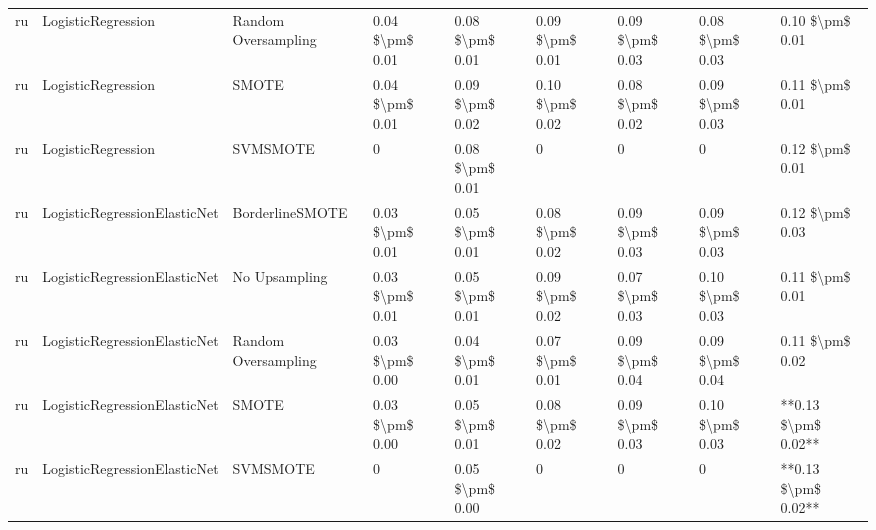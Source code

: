 \begin{tabular}{lllllllll}
      ru &              LogisticRegression &           Random Oversampling & 0.04 \$\textbackslash pm\$ 0.01 &           0.08 \$\textbackslash pm\$ 0.01 &       0.09 \$\textbackslash pm\$ 0.01 &        0.09 \$\textbackslash pm\$ 0.03 &                         0.08 \$\textbackslash pm\$ 0.03 &     0.10 \$\textbackslash pm\$ 0.01 \\
      ru &              LogisticRegression &                         SMOTE & 0.04 \$\textbackslash pm\$ 0.01 &           0.09 \$\textbackslash pm\$ 0.02 &       0.10 \$\textbackslash pm\$ 0.02 &        0.08 \$\textbackslash pm\$ 0.02 &                         0.09 \$\textbackslash pm\$ 0.03 &     0.11 \$\textbackslash pm\$ 0.01 \\
      ru &              LogisticRegression &                      SVMSMOTE &               0 &           0.08 \$\textbackslash pm\$ 0.01 &                     0 &                      0 &                                       0 &     0.12 \$\textbackslash pm\$ 0.01 \\
      ru &    LogisticRegressionElasticNet &               BorderlineSMOTE & 0.03 \$\textbackslash pm\$ 0.01 &           0.05 \$\textbackslash pm\$ 0.01 &       0.08 \$\textbackslash pm\$ 0.02 &        0.09 \$\textbackslash pm\$ 0.03 &                         0.09 \$\textbackslash pm\$ 0.03 &     0.12 \$\textbackslash pm\$ 0.03 \\
      ru &    LogisticRegressionElasticNet &                 No Upsampling & 0.03 \$\textbackslash pm\$ 0.01 &           0.05 \$\textbackslash pm\$ 0.01 &       0.09 \$\textbackslash pm\$ 0.02 &        0.07 \$\textbackslash pm\$ 0.03 &                         0.10 \$\textbackslash pm\$ 0.03 &     0.11 \$\textbackslash pm\$ 0.01 \\
      ru &    LogisticRegressionElasticNet &           Random Oversampling & 0.03 \$\textbackslash pm\$ 0.00 &           0.04 \$\textbackslash pm\$ 0.01 &       0.07 \$\textbackslash pm\$ 0.01 &        0.09 \$\textbackslash pm\$ 0.04 &                         0.09 \$\textbackslash pm\$ 0.04 &     0.11 \$\textbackslash pm\$ 0.02 \\
      ru &    LogisticRegressionElasticNet &                         SMOTE & 0.03 \$\textbackslash pm\$ 0.00 &           0.05 \$\textbackslash pm\$ 0.01 &       0.08 \$\textbackslash pm\$ 0.02 &        0.09 \$\textbackslash pm\$ 0.03 &                         0.10 \$\textbackslash pm\$ 0.03 & **0.13 \$\textbackslash pm\$ 0.02** \\
      ru &    LogisticRegressionElasticNet &                      SVMSMOTE &               0 &           0.05 \$\textbackslash pm\$ 0.00 &                     0 &                      0 &                                       0 & **0.13 \$\textbackslash pm\$ 0.02** \\

\end{tabular}
